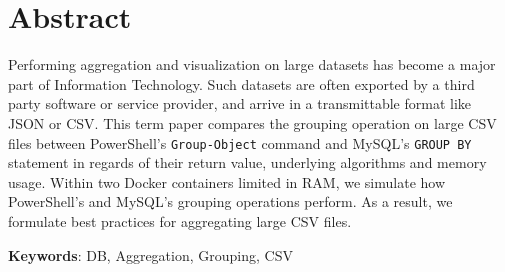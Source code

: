 
\section*{Abstract}
Performing aggregation and visualization on large datasets has become a major part of Information Technology.
Such datasets are often exported by a third party software or service provider, and arrive in a transmittable
format like \gls{JSON} or \gls{CSV}.
This term paper compares the grouping operation on large \gls{CSV} files between PowerShell's
\verb+Group-Object+ command and \gls{MySQL}'s \verb+GROUP BY+ statement in regards of
their return value, underlying algorithms and memory usage. Within two \gls{Docker} containers
limited in \gls{RAM}, we simulate how PowerShell's and MySQL's grouping operations perform. As a result,
we formulate best practices for aggregating large \gls{CSV} files.

\textbf{Keywords}: \gls{DB}, Aggregation, Grouping, \gls{CSV}

\newpage